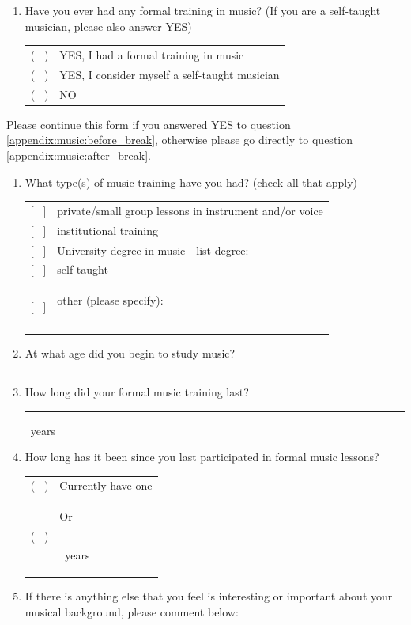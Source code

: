 \documentclass[a4paper,11pt]{article}
\newcommand{\myunderline}{\rule{2in}{.5pt}}
\begin{document}
\begin{appendices}
\begin{enumerate}[resume]
	\item \label{appendix:music:before_break}Have you ever had any formal training in music? (If you are a self-taught musician, please also answer YES)

	\begin{tabular}{l l}
		( \ ) & YES, I had a formal training in music \\
		( \ ) & YES, I consider myself a self-taught musician \\
		( \ ) & NO \\
	\end{tabular}

\end{enumerate}
Please continue this form if you answered YES to question \ref{appendix:music:before_break}, otherwise please go directly to question \ref{appendix:music:after_break}.
\begin{enumerate}[resume]

	\item What type(s) of music training have you had? (check all that apply)

	\begin{tabular}{l l}
		{[{ \ }]} & private/small group lessons in instrument and/or voice \\
		{[{ \ }]} & institutional training \\
		{[{ \ }]} & University degree in music - list degree: \\
		{[{ \ }]} & self-taught \\
		{[{ \ }]} & other (please specify): \myunderline \\
	\end{tabular}

 	\item At what age did you begin to study music?

 	\myunderline

 	\item How long did your formal music training last?

 	\myunderline \ years
 	\item How long has it been since you last participated in formal music lessons?

	\begin{tabular}{l l}
		( \ ) & Currently have one \\
		( \ ) & Or \myunderline \ years \\
	\end{tabular}

	\item \label{appendix:music:after_break}If there is anything else that you feel is interesting or important about your musical background, please comment below:


\end{enumerate}
\end{appendices}
\end{document}
